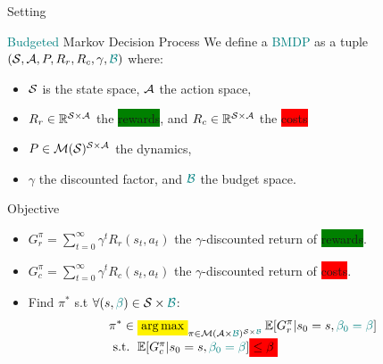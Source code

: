 \documentclass{beamer}
\newcommand{\mathcolorbox}[2]{\colorbox{#1}{$\displaystyle #2$}}
\begin{document}
    \begin{frame}{Setting}
        \begin{block}{\textcolor{teal}{Budgeted} Markov Decision Process}
            We define a \textcolor{teal}{BMDP} as a tuple $(\mathcal{S}, \mathcal{A}, P, R_r,{R_c}, \gamma,\textcolor{teal}{\mathcal{B}})$ where:
            \begin{itemize}
                \item  $\mathcal{S}$ is the state space, $\mathcal{A}$ the action space,
                \item $R_r\in\mathbb{R}^{\mathcal{S} \times \mathcal{A}}$ the \colorbox{green}{rewards}, and $R_c\in\mathbb{R}^{\mathcal{S} \times \mathcal{A}}$ the \colorbox{red}{costs}
                \item $P\in \mathcal{M}(\mathcal{S})^{\mathcal{S} \times \mathcal{A}}$ the dynamics, %
                \item $\gamma$ the discounted factor, and $\textcolor{teal}{\mathcal{B}}$ the budget space.
            \end{itemize}
        \end{block}

        \begin{block}{Objective}
            \begin{itemize}
                \item $G_r^\pi = \sum_{t=0}^\infty \gamma^t R_r(s_t, a_t)$ the $\gamma$-discounted return of \colorbox{green}{rewards}.
                \item  $G_c^\pi = \sum_{t=0}^\infty \gamma^t R_c(s_t, a_t)$ the $\gamma$-discounted return of \colorbox{red}{costs}.
                \item Find $\pi^*$ s.t $\forall (s,\textcolor{teal}{\beta})\in\mathcal{S}\times\textcolor{teal}{\mathcal{B}}$:
                \begin{equation}
                    \label{eq:bmdp}
                    \begin{array}{lcr}
                        \displaystyle \pi^* \in \mathcolorbox{yellow}{\argmax}_{\pi\in\cM(\cA\times\textcolor{teal}{\cB})^{\cS\times\textcolor{teal}{\cB}}} \expectedvalue[G_r^\pi | s_0=s,\textcolor{teal}{\beta_0=\beta}] \\
                        \text{ s.t. }  \expectedvalue[G_c^\pi | s_0=s,\textcolor{teal}{\beta_0=\beta}] \mathcolorbox{red}{\leq \beta}
                    \end{array}
                \end{equation}
            \end{itemize}
        \end{block}
    \end{frame}
\end{document}
